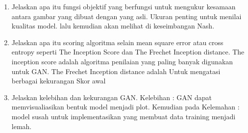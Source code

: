 \begin{enumerate}
	\item Jelaskan apa itu fungsi objektif yang berfungsi untuk mengukur kesamaan antara gambar yang dibuat dengan yang asli.
    \hfill\break
    Ukuran penting untuk menilai kualitas model. lalu kemudian akan melihat di keseimbangan Nash.

	\item Jelaskan apa itu scoring algoritma selain mean square error atau cross entropy seperti The Inception Score dan The Frechet Inception distance.
	\hfill\break
	The inception score adalah algoritma penilaian yang paling banyak digunakan untuk GAN. The Frechet Inception distance adalah Untuk mengatasi berbagai kekurangan Skor awal

	\item Jelaskan kelebihan dan kekurangan GAN.
	\hfill\break
	Kelebihan : GAN dapat memvisualiasikan bentuk model menjadi plot. Kemudian pada Kelemahan : model susah untuk implementasikan yang membuat data training menjadi lemah.
\end{enumerate}

